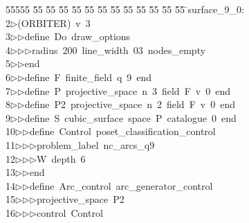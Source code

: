 %
%
\begin{tabbing}
55555 \= 55 \= 55 \= 55 \= 55 \= 55 \= 55 \= 55 \= 55 \= 55 \= 55 \= 55 \= 55 \= \>surface\_9\_0:\\[0pt]
2\>$\triangleright$\>(ORBITER)\ v\ 3\ \\[0pt]
3\>$\triangleright$\>$\triangleright$\>define\ Do\ draw\_options\ \\[0pt]
4\>$\triangleright$\>$\triangleright$\>$\triangleright$\>radius\ 200\ line\_width\ 03\ nodes\_empty\ \\[0pt]
5\>$\triangleright$\>$\triangleright$\>end\ \\[0pt]
6\>$\triangleright$\>$\triangleright$\>define\ F\ finite\_field\ q\ 9\ end\ \\[0pt]
7\>$\triangleright$\>$\triangleright$\>define\ P\ projective\_space\ n\ 3\ field\ F\ v\ 0\ end\ \\[0pt]
8\>$\triangleright$\>$\triangleright$\>define\ P2\ projective\_space\ n\ 2\ field\ F\ v\ 0\ end\ \\[0pt]
9\>$\triangleright$\>$\triangleright$\>define\ S\ cubic\_surface\ space\ P\ catalogue\ 0\ end\ \\[0pt]
10\>$\triangleright$\>$\triangleright$\>define\ Control\ poset\_classification\_control\ \\[0pt]
11\>$\triangleright$\>$\triangleright$\>$\triangleright$\>problem\_label\ nc\_arcs\_q9\ \\[0pt]
12\>$\triangleright$\>$\triangleright$\>$\triangleright$\>W\ depth\ 6\ \\[0pt]
13\>$\triangleright$\>$\triangleright$\>end\ \\[0pt]
14\>$\triangleright$\>$\triangleright$\>define\ Arc\_control\ arc\_generator\_control\ \\[0pt]
15\>$\triangleright$\>$\triangleright$\>$\triangleright$\>projective\_space\ P2\ \\[0pt]
16\>$\triangleright$\>$\triangleright$\>$\triangleright$\>control\ Control\ \\[0pt]

\end{tabbing}
